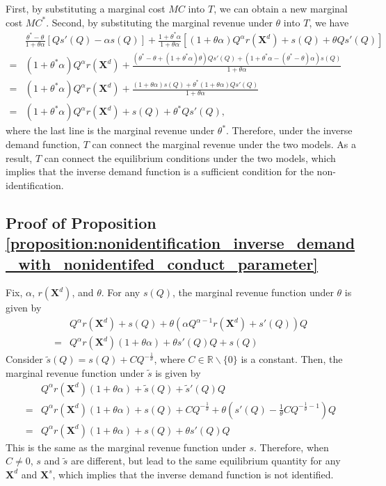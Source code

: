 \documentclass[11pt, a4paper]{article}
\begin{document}
First, by substituting a marginal cost $MC$ into $T$, we can obtain a new marginal cost $MC^{*}$.
Second, by substituting the marginal revenue under $\theta$ into $T$, we have
\begin{align}
    & \frac{\theta^{*} - \theta}{1 + \theta\alpha} \left[Qs'(Q) - \alpha s(Q) \right] + \frac{1 + \theta^{*}\alpha}{1 + \theta\alpha} \left[(1+\theta\alpha) Q^{\alpha}r(\bm{X}^{d}) + s(Q) + \theta Qs'(Q)\right]\\
    = & (1 + \theta^{*}\alpha)Q^{\alpha}r(\bm{X}^{d}) + \frac{(\theta^{*} - \theta + (1 + \theta^{*}\alpha)\theta)Qs'(Q) + (1 + \theta^{*}\alpha - (\theta^{*} - \theta)\alpha) s(Q)}{1 + \theta\alpha}\\
    = & (1 + \theta^{*}\alpha)Q^{\alpha}r(\bm{X}^{d}) + \frac{(1 + \theta\alpha) s(Q) + \theta^{*}(1 + \theta\alpha)Qs'(Q) }{1 + \theta\alpha}\\
    = & (1 + \theta^{*}\alpha)Q^{\alpha}r(\bm{X}^{d}) +s(Q) + \theta^{*}Qs'(Q),
\end{align}
where the last line is the marginal revenue under $\theta^{*}$.
Therefore, under the inverse demand function, $T$ can connect the marginal revenue under the two models.
As a result, $T$ can connect the equilibrium conditions under the two models, which implies that the inverse demand function is a sufficient condition for the non-identification.




\subsection{Proof of Proposition \ref{proposition:nonidentification_inverse_demand_with_nonidentifed_conduct_parameter}}

Fix, $\alpha$, $r(\bm{X}^{d})$, and $\theta$.
For any $s(Q)$, the marginal revenue function under $\theta$ is given by
\begin{align}
    &Q^{\alpha}r(\bm{X}^{d}) +s(Q) + \theta(\alpha Q^{\alpha-1}r(\bm{X}^{d}) + s'(Q))Q\\
    = & Q^{\alpha}r(\bm{X}^{d})(1+ \theta\alpha) + \theta s'(Q)Q + s(Q)
\end{align}
Consider $\tilde{s}(Q) = s(Q) + C Q^{-\frac{1}{\theta}}$, where $C\in \mathbb{R}\backslash \{0\}$ is a constant.
Then, the marginal revenue function under $\tilde{s}$ is given by
\begin{align}
    & Q^{\alpha}r(\bm{X}^{d})(1 + \theta\alpha) + \tilde{s}(Q) + \tilde{s}'(Q)Q\\
    = & Q^{\alpha}r(\bm{X}^{d})(1 + \theta\alpha) + s(Q) + C Q^{-\frac{1}{\theta}} + \theta\left(s'(Q) -\frac{1}{\theta} C Q^{-\frac{1}{\theta}-1}\right)Q\\
    =& Q^{\alpha}r(\bm{X}^{d})(1 + \theta\alpha) + s(Q) + \theta s'(Q)Q
\end{align}
This is the same as the marginal revenue function under $s$.
Therefore, when $C\ne 0$, $s$ and $\tilde{s}$ are different, but lead to the same equilibrium quantity for any $\bm{X}^{d}$ and $\bm{X}^{s}$, which implies that the inverse demand function is not identified.
\end{document}

